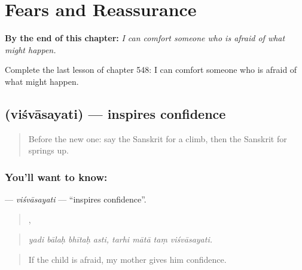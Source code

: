 
\chapter{Fears and Reassurance}
\label{ch:sa-fears-and-reassurance}

\begin{chapteropening}
\textbf{By the end of this chapter:} \emph{I can comfort someone who is afraid of what might happen.}

Complete the last lesson of chapter 548: I can comfort someone who is afraid of what might happen.
\end{chapteropening}

\section[\texorpdfstring{\sk{विश्वासयति} (viśvāsayati)}{विश्वासयति (viśvāsayati)}]{ (viśvāsayati) — inspires confidence}

\label{lesson:SA-C548-visvasayati}



\begin{quote}
Before the new one: say the Sanskrit for a climb, then the Sanskrit for springs up.
\end{quote}

\subsection*{You'll want to know: }
\textbf{} — \emph{viśvāsayati} — \textquotedblleft{}inspires confidence\textquotedblright{}.

\begin{quote}
   ,    
\end{quote}

\begin{quote}
\emph{yadi bālaḥ bhītaḥ asti, tarhi mātā taṃ viśvāsayati.}
\end{quote}

\begin{quote}
If the child is afraid, my mother gives him confidence.
\end{quote}

